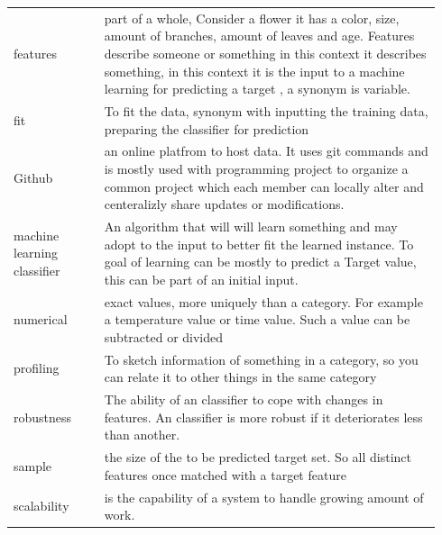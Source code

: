 \documentclass[a4paper,10pt]{article}
\begin{document}
\begin{tabular}{ p{0.20\linewidth} p{0.7437\linewidth} }
	features & part of a whole, Consider a flower it has a color, size, amount of branches, amount of leaves and age. Features describe someone or something in this context it describes something, in this context it is the input to a machine learning for predicting a target , a synonym is variable.\\ [1ex]
	
	fit & To fit the data, synonym with inputting the training data, preparing the classifier for prediction\\ [1ex]
	
	Github & an online platfrom to host data. It uses git commands and is mostly used with programming project to organize a common project which each member can locally alter and centeralizly share updates or modifications. \\ [1ex]	
	
	machine learning classifier & An algorithm that will will learn something and may adopt to the input to better fit the learned instance. To goal of learning can be mostly to predict a Target value, this can be part of an initial input.\\ [1ex]	
	
	numerical & exact values, more uniquely than a category. For example a temperature value or time value. Such a value can be subtracted or divided \\ [1ex]	
	
	profiling & To sketch information of something in a category, so you can relate it to other things in the same category\\ [1ex]
	
	robustness &  The ability of an classifier to cope with changes in features. An classifier is more robust if it deteriorates less than another. \\ [1ex]	
	
	sample & the size of the to be predicted target set. So all distinct features once matched with a target feature\\ [1ex]
	
	scalability & is the capability of a system to handle growing amount of work. \\[1ex]
	
	
	
\end{tabular}
\newpage
\end{document}
